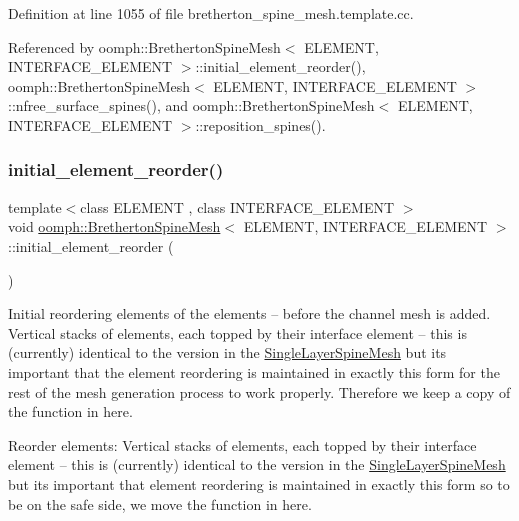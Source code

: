 Definition at line 1055 of file bretherton\+\_\+spine\+\_\+mesh.\+template.\+cc.



Referenced by oomph\+::\+Bretherton\+Spine\+Mesh$<$ E\+L\+E\+M\+E\+N\+T, I\+N\+T\+E\+R\+F\+A\+C\+E\+\_\+\+E\+L\+E\+M\+E\+N\+T $>$\+::initial\+\_\+element\+\_\+reorder(), oomph\+::\+Bretherton\+Spine\+Mesh$<$ E\+L\+E\+M\+E\+N\+T, I\+N\+T\+E\+R\+F\+A\+C\+E\+\_\+\+E\+L\+E\+M\+E\+N\+T $>$\+::nfree\+\_\+surface\+\_\+spines(), and oomph\+::\+Bretherton\+Spine\+Mesh$<$ E\+L\+E\+M\+E\+N\+T, I\+N\+T\+E\+R\+F\+A\+C\+E\+\_\+\+E\+L\+E\+M\+E\+N\+T $>$\+::reposition\+\_\+spines().

\mbox{\label{classoomph_1_1BrethertonSpineMesh_a52ffe1a705cb720d09c831b9cf5397f6}} 
\subsubsection{\texorpdfstring{initial\+\_\+element\+\_\+reorder()}{initial\_element\_reorder()}}
{\footnotesize\ttfamily template$<$class E\+L\+E\+M\+E\+NT , class I\+N\+T\+E\+R\+F\+A\+C\+E\+\_\+\+E\+L\+E\+M\+E\+NT $>$ \\
void \hyperlink{classoomph_1_1BrethertonSpineMesh}{oomph\+::\+Bretherton\+Spine\+Mesh}$<$ E\+L\+E\+M\+E\+NT, I\+N\+T\+E\+R\+F\+A\+C\+E\+\_\+\+E\+L\+E\+M\+E\+NT $>$\+::initial\+\_\+element\+\_\+reorder (\begin{DoxyParamCaption}{ }\end{DoxyParamCaption})\hspace{0.3cm}{\ttfamily [protected]}}



Initial reordering elements of the elements -- before the channel mesh is added. Vertical stacks of elements, each topped by their interface element -- this is (currently) identical to the version in the \hyperlink{classoomph_1_1SingleLayerSpineMesh}{Single\+Layer\+Spine\+Mesh} but it\textquotesingle{}s important that the element reordering is maintained in exactly this form for the rest of the mesh generation process to work properly. Therefore we keep a copy of the function in here. 

Reorder elements\+: Vertical stacks of elements, each topped by their interface element -- this is (currently) identical to the version in the \hyperlink{classoomph_1_1SingleLayerSpineMesh}{Single\+Layer\+Spine\+Mesh} but it\textquotesingle{}s important that element reordering is maintained in exactly this form so to be on the safe side, we move the function in here. 

